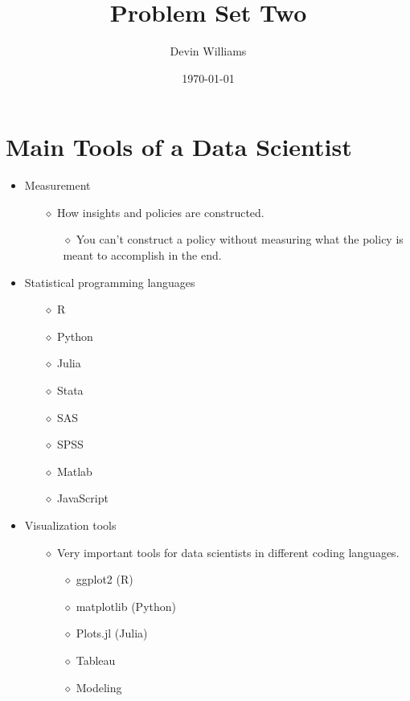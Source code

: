 \documentclass[11pt,letterpaper]{article}
\title{\textbf{Problem Set Two}}
\author{Devin Williams}
\date{\today}
\begin{document}
\maketitle

\section*{Main Tools of a Data Scientist}

\begin{itemize}
    \item Measurement
        \begin{itemize}
            \item[$\diamond$] How insights and policies are constructed.
        \begin{itemize}
            \item[$\diamond$] You can't construct a policy without measuring what the policy is meant to accomplish in the end. 
        \end{itemize}
        \end{itemize}
    \item Statistical programming languages
       \begin{itemize}
        \item[$\diamond$] R
        \item[$\diamond$] Python
        \item[$\diamond$] Julia
        \item[$\diamond$] Stata
        \item[$\diamond$] SAS
        \item[$\diamond$] SPSS
        \item[$\diamond$] Matlab
        \item[$\diamond$] JavaScript
        \end{itemize}
    \item Visualization tools
        \begin{itemize}
        \item[$\diamond$] Very important tools for data scientists in different coding languages.
            \begin{itemize}
        \item[$\diamond$] ggplot2 (R)
        \item[$\diamond$] matplotlib (Python)
        \item[$\diamond$] Plots.jl (Julia)
        \item[$\diamond$] Tableau
        \item[$\diamond$] Modeling

\end{itemize}
\end{itemize}
\end{itemize}
\end{document}
